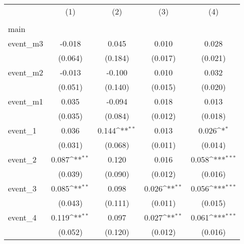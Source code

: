 {
\def\sym#1{\ifmmode^{#1}\else\(^{#1}\)\fi}
\begin{tabular}{l*{4}{c}}
\hline\hline
                    &\multicolumn{1}{c}{(1)}&\multicolumn{1}{c}{(2)}&\multicolumn{1}{c}{(3)}&\multicolumn{1}{c}{(4)}\\
                    &\multicolumn{1}{c}{} &\multicolumn{1}{c}{} &\multicolumn{1}{c}{} &\multicolumn{1}{c}{} \\
\hline
main                &                     &                     &                     &                     \\
event\_m3            &      -0.018         &       0.045         &       0.010         &       0.028         \\
                    &     (0.064)         &     (0.184)         &     (0.017)         &     (0.021)         \\
[1em]
event\_m2            &      -0.013         &      -0.100         &       0.010         &       0.032         \\
                    &     (0.051)         &     (0.140)         &     (0.015)         &     (0.020)         \\
[1em]
event\_m1            &       0.035         &      -0.094         &       0.018         &       0.013         \\
                    &     (0.035)         &     (0.084)         &     (0.012)         &     (0.018)         \\
[1em]
event\_1             &       0.036         &       0.144\sym{**} &       0.013         &       0.026\sym{*}  \\
                    &     (0.031)         &     (0.068)         &     (0.011)         &     (0.014)         \\
[1em]
event\_2             &       0.087\sym{**} &       0.120         &       0.016         &       0.058\sym{***}\\
                    &     (0.039)         &     (0.090)         &     (0.012)         &     (0.016)         \\
[1em]
event\_3             &       0.085\sym{**} &       0.098         &       0.026\sym{**} &       0.056\sym{***}\\
                    &     (0.043)         &     (0.111)         &     (0.011)         &     (0.015)         \\
[1em]
event\_4             &       0.119\sym{**} &       0.097         &       0.027\sym{**} &       0.061\sym{***}\\
                    &     (0.052)         &     (0.120)         &     (0.012)         &     (0.016)         \\

\end{tabular}}

